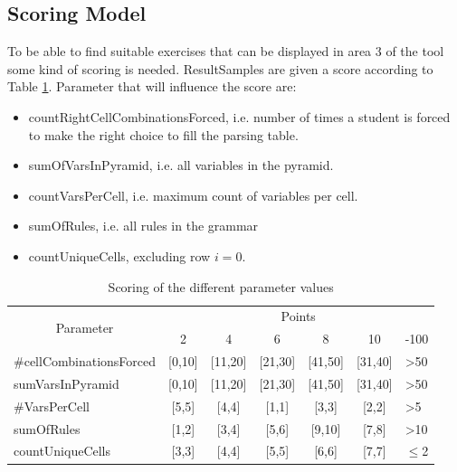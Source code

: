 \clearpage

\subsection{Scoring Model} \label{scoringModel}
To be able to find suitable exercises that can be displayed in area 3 of the tool some kind of scoring is needed. ResultSamples are given a score according to Table \ref{scoring}. Parameter that will influence the score are:
\begin{itemize}
	\item countRightCellCombinationsForced, i.e. number of times a student is forced to make the right choice to fill the parsing table.
	\item sumOfVarsInPyramid, i.e. all variables in the pyramid.
	\item countVarsPerCell, i.e. maximum count of variables per cell.
	\item sumOfRules, i.e. all rules in the grammar
	\item countUniqueCells, excluding row $i=0$. 
\end{itemize}
\begin{table}[H]
	\centering
	\begin{tabular}{|l|c|c|c|c|c|l|}
		\hline
		\multicolumn{1}{|c|}{\multirow{2}{*}{Parameter}} & \multicolumn{6}{c|}{Points}                                                          \\ \cline{2-7} 
		\multicolumn{1}{|c|}{}		& 2          & 4           & 6           & 8           & 10          & -100            \\ \hline
		\#cellCombinationsForced      & {[}0,10{]} & {[}11,20{]} & {[}21,30{]} & {[}41,50{]} & {[}31,40{]} & \textgreater 50 \\ \hline
		sumVarsInPyramid            & {[}0,10{]} & {[}11,20{]} & {[}21,30{]} & {[}41,50{]} & {[}31,40{]} & \textgreater 50 \\ \hline
		\#VarsPerCell              & {[}5,5{]}  & {[}4,4{]}   & {[}1,1{]}   & {[}3,3{]}   & {[}2,2{]}   & \textgreater 5  \\ \hline
		sumOfRules              & {[}1,2{]}  & {[}3,4{]}   & {[}5,6{]}   & {[}9,10{]}  & {[}7,8{]}   & \textgreater 10 \\ \hline		countUniqueCells & {[}3,3{]}  & {[}4,4{]}   & {[}5,5{]}   & {[}6,6{]}  & {[}7,7{]}   & $\leq$2  \\ \hline
	\end{tabular}
	\caption{Scoring of the different parameter values}
	\label{scoring}
\end{table}



